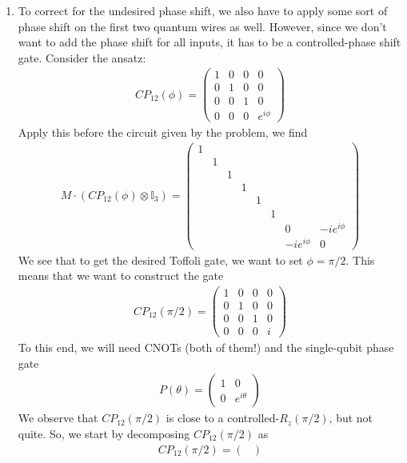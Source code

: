 \documentclass{article}
\theoremstyle{definition}
\begin{document}
\begin{enumerate}[label=(\alph*)]
	\item To correct for the undesired phase shift, we also have to apply some sort of phase shift on the first two quantum wires as well. However, since we don't want to add the phase shift for all inputs, it has to be a controlled-phase shift gate. Consider the ansatz:
	\begin{align*}
		CP_{12}(\phi) = \begin{pmatrix}
			1 &0&0&0\\
			0&1&0&0\\
			0&0&1&0\\
			0&0&0&e^{i\phi}
		\end{pmatrix}
	\end{align*}
	Apply this before the circuit given by the problem, we find 
	\begin{align*}
		M\cdot ( CP_{12}(\phi) \otimes \mathbb{I}_3) = \begin{pmatrix}
			1&&&&&&& \\
			&1&&&&&& \\
			&&1&&&&& \\
			&&&1&&&& \\
			&&&&1&&& \\
			&&&&&1&& \\
			&&&&&&0&-ie^{i\phi} \\
			&&&&&&-i e^{i\phi}&0 
		\end{pmatrix}
	\end{align*}
	We see that to get the desired Toffoli gate, we want to set $\phi = \pi/2$. This means that we want to construct the gate
	\begin{align*}
		CP_{12}(\pi/2) = \begin{pmatrix}
			1 &0&0&0\\
			0&1&0&0\\
			0&0&1&0\\
			0&0&0&i
		\end{pmatrix}
\end{align*}
To this end, we will need CNOTs (both of them!) and the single-qubit phase gate 
\begin{align*}
	P(\theta) = \begin{pmatrix}
		1 & 0 \\ 0 & e^{i\theta}
	\end{pmatrix}
\end{align*}
We observe that $CP_{12}(\pi/2)$ is close to a controlled-$R_z(\pi/2)$, but not quite.  So, we start by decomposing $CP_{12}(\pi/2)$ as 
\begin{align*}
	CP_{12}(\pi/2) = \begin{pmatrix}

\end{pmatrix}
\end{align*}
\end{enumerate}
\end{document}
